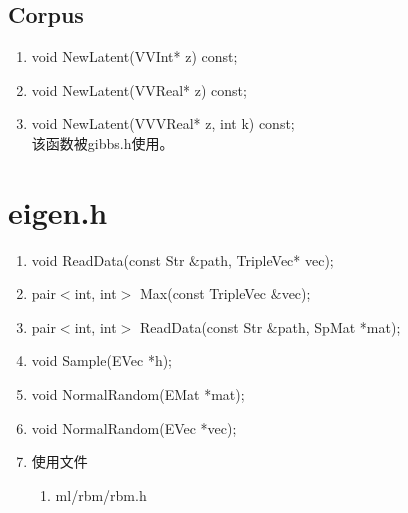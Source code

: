 \subsection{Corpus}
\begin{enumerate}
\item void NewLatent(VVInt* z) const;
\item void NewLatent(VVReal* z) const;
\item void NewLatent(VVVReal* z, int k) const;
\\该函数被gibbs.h使用。
\end{enumerate}

\section{eigen.h}

\begin{enumerate}
\item void ReadData(const Str $\&$path, TripleVec* vec);
\item pair$<$int, int$>$ Max(const TripleVec $\&$vec);
\item pair$<$int, int$>$ ReadData(const Str $\&$path, SpMat *mat);
\item void Sample(EVec *h);
\item void NormalRandom(EMat *mat);
\item void NormalRandom(EVec *vec);

\item 使用文件
\begin{enumerate}
\item ml/rbm/rbm.h
\end{enumerate}
\end{enumerate}

